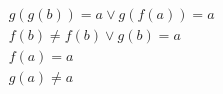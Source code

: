 \begin{align*}
%
& g(g(b)) = a \lor g(f(a)) = a
~\\~
& f(b)  \neq  f(b) \lor g(b) = a
~\\~
& f(a) = a
~\\~
& g(a)  \neq  a
%
\end{align*}
